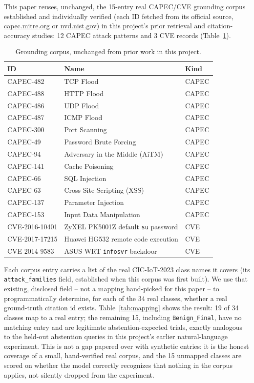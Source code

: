 \documentclass[11pt]{article}
\begin{document}
This paper reuses, unchanged, the 15-entry real CAPEC/CVE grounding corpus
established and individually verified (each ID fetched from its official
source, \url{capec.mitre.org} or \url{nvd.nist.gov}) in this project's
prior retrieval and citation-accuracy studies: 12 CAPEC attack patterns and
3 CVE records (Table~\ref{tab:corpus}).

\begin{table}[h]
\centering
\small
\begin{tabular}{lll}
\toprule
\textbf{ID} & \textbf{Name} & \textbf{Kind} \\
\midrule
CAPEC-482 & TCP Flood & CAPEC \\
CAPEC-488 & HTTP Flood & CAPEC \\
CAPEC-486 & UDP Flood & CAPEC \\
CAPEC-487 & ICMP Flood & CAPEC \\
CAPEC-300 & Port Scanning & CAPEC \\
CAPEC-49 & Password Brute Forcing & CAPEC \\
CAPEC-94 & Adversary in the Middle (AiTM) & CAPEC \\
CAPEC-141 & Cache Poisoning & CAPEC \\
CAPEC-66 & SQL Injection & CAPEC \\
CAPEC-63 & Cross-Site Scripting (XSS) & CAPEC \\
CAPEC-137 & Parameter Injection & CAPEC \\
CAPEC-153 & Input Data Manipulation & CAPEC \\
CVE-2016-10401 & ZyXEL PK5001Z default \texttt{su} password & CVE \\
CVE-2017-17215 & Huawei HG532 remote code execution & CVE \\
CVE-2014-9583 & ASUS WRT \texttt{infosvr} backdoor & CVE \\
\bottomrule
\end{tabular}
\caption{Grounding corpus, unchanged from prior work in this project.}
\label{tab:corpus}
\end{table}

Each corpus entry carries a list of the real CIC-IoT-2023 class names it
covers (its \texttt{attack\_families} field, established when this corpus
was first built). We use that existing, disclosed field -- not a mapping
hand-picked for this paper -- to programmatically determine, for each of
the 34 real classes, whether a real ground-truth citation id exists.
Table~\ref{tab:mapping} shows the result: 19 of 34 classes map to a real
entry; the remaining 15, including \texttt{Benign\_Final}, have no matching
entry and are legitimate abstention-expected trials, exactly analogous to
the held-out abstention queries in this project's earlier natural-language
experiment. This is not a gap papered over with synthetic entries: it is
the honest coverage of a small, hand-verified real corpus, and the 15
unmapped classes are scored on whether the model correctly recognizes that
nothing in the corpus applies, not silently dropped from the experiment.
\end{document}
